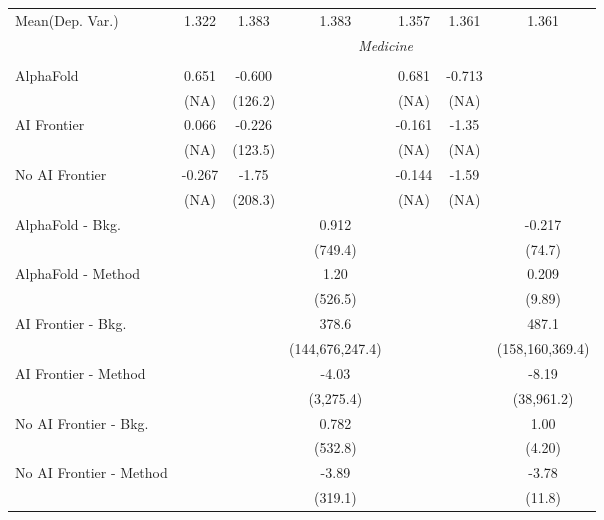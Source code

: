 \begin{tabular}{lcccccc}
Mean(Dep. Var.) & 1.322 & 1.383 & 1.383 & 1.357 & 1.361 & 1.361 \\
 & \multicolumn{6}{c}{\textit{Medicine}} \\ \\
   AlphaFold               & 0.651  & -0.600  &                 & 0.681  & -0.713 &   \\   
                           & (NA)   & (126.2) &                 & (NA)   & (NA)   &   \\   
   AI Frontier             & 0.066  & -0.226  &                 & -0.161 & -1.35  &   \\   
                           & (NA)   & (123.5) &                 & (NA)   & (NA)   &   \\   
   No AI Frontier          & -0.267 & -1.75   &                 & -0.144 & -1.59  &   \\   
                           & (NA)   & (208.3) &                 & (NA)   & (NA)   &   \\   
   AlphaFold - Bkg.        &        &         & 0.912           &        &        & -0.217\\   
                           &        &         & (749.4)         &        &        & (74.7)\\   
   AlphaFold - Method      &        &         & 1.20            &        &        & 0.209\\   
                           &        &         & (526.5)         &        &        & (9.89)\\   
   AI Frontier - Bkg.      &        &         & 378.6           &        &        & 487.1\\   
                           &        &         & (144,676,247.4) &        &        & (158,160,369.4)\\   
   AI Frontier - Method    &        &         & -4.03           &        &        & -8.19\\   
                           &        &         & (3,275.4)       &        &        & (38,961.2)\\   
   No AI Frontier - Bkg.   &        &         & 0.782           &        &        & 1.00\\   
                           &        &         & (532.8)         &        &        & (4.20)\\   
   No AI Frontier - Method &        &         & -3.89           &        &        & -3.78\\   
                           &        &         & (319.1)         &        &        & (11.8)\\   

\end{tabular}
